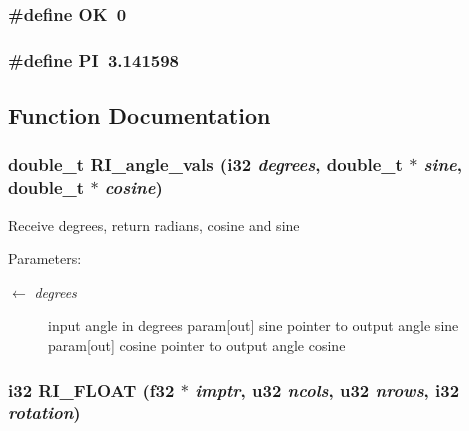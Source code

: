 \subsubsection{\setlength{\rightskip}{0pt plus 5cm}\#define OK~0}\label{GU__transformations_8c_ba51915c87d64af47fb1cc59348961c9}


\subsubsection{\setlength{\rightskip}{0pt plus 5cm}\#define PI~3.141598}\label{GU__transformations_8c_598a3330b3c21701223ee0ca14316eca}




\subsection{Function Documentation}
\subsubsection{\setlength{\rightskip}{0pt plus 5cm}double\_\-t RI\_\-angle\_\-vals (i32 {\em degrees}, double\_\-t $\ast$ {\em sine}, double\_\-t $\ast$ {\em cosine})}\label{GU__transformations_8c_3cd2a7581d1db12044229a58ea56874a}


Receive degrees, return radians, cosine and sine \begin{Desc}
\item[Parameters:]
\begin{description}
\item[\mbox{$\leftarrow$} {\em degrees}]input angle in degrees param[out] sine pointer to output angle sine param[out] cosine pointer to output angle cosine \end{description}
\end{Desc}
\subsubsection{\setlength{\rightskip}{0pt plus 5cm}i32 RI\_\-FLOAT (f32 $\ast$ {\em imptr}, u32 {\em ncols}, u32 {\em nrows}, i32 {\em rotation})}\label{GU__transformations_8c_c6b9093dd001418072247d73f6c5dda7}


